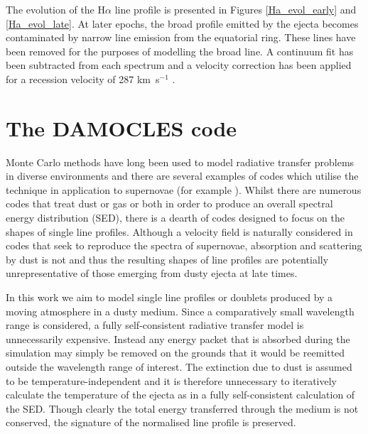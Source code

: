 \documentclass[useAMS,usenatbib,usegraphicx]{mnras}
\begin{document}
The evolution of the H$\alpha$ line profile is presented in Figures 
\ref{Ha_evol_early} and \ref{Ha_evol_late}.  At later epochs, the broad 
profile emitted by the ejecta becomes contaminated by narrow line emission 
from the equatorial ring.  These lines have been removed for the purposes 
of modelling the broad line. A continuum fit has been subtracted from each 
spectrum and a velocity correction has been applied for a recession 
velocity of 287 km~s$^{-1}$ \citep{Groningsson2008}.



\section{The DAMOCLES code}
\label{code}

Monte Carlo methods have long been used to model radiative transfer 
problems in diverse environments and there are several examples of codes 
which utilise the technique in application to supernovae 
(for example \citet{Maeda2003, Lucy2005c, Jerkstrand2012,Owen2015}).  Whilst there are numerous codes that 
treat dust or gas or both in order to produce an overall spectral energy 
distribution (SED), there is a dearth of codes designed to focus on the 
shapes of single line profiles.  Although a velocity field is naturally 
considered in codes that seek to reproduce the spectra of supernovae, 
absorption and scattering by dust is not and thus the resulting shapes of 
line profiles are potentially unrepresentative of those emerging from 
dusty ejecta at late times.

In this work we aim to model single line profiles or doublets produced by 
a moving atmosphere in a dusty medium.  
Since a comparatively small wavelength range is considered, a fully 
self-consistent radiative transfer model is unnecessarily expensive.  
Instead any energy packet that is absorbed during the simulation may 
simply be removed on the grounds that it would be 
reemitted outside the wavelength range of interest. The extinction due to 
dust is assumed to be temperature-independent and it is therefore 
unnecessary to iteratively calculate the temperature of the ejecta as in a 
fully self-consistent calculation of the SED.  Though clearly the total 
energy transferred through the medium is not conserved, the signature of 
the normalised line profile is preserved.
\end{document}

